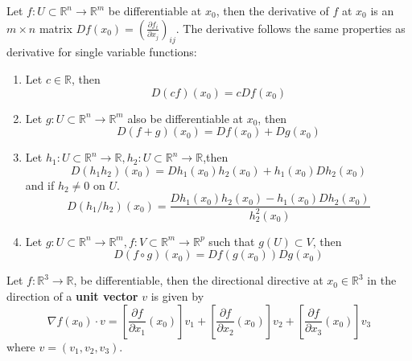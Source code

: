 \documentclass[openany]{book}
\newcommand{\R}{\mathbb{R}}
\begin{document}
\begin{prop}
    Let $f:U\subset\R^n\to\R^m$ be differentiable at $x_0$, then the derivative of $f$ at $x_0$ is an $m\times n$ matrix $Df(x_0)=\left(\frac{\partial f_i}{\partial x_j}\right)_{ij}$. The derivative follows the same properties as derivative for single variable functions:
    \begin{enumerate}
        \item Let $c\in\R$, then 
        \begin{equation*}
            D(cf)(x_0)=cDf(x_0) \tag {multiplication of a matrix by constant $c$}
        \end{equation*}
        \item Let $g: U\subset\R^n\to\R^m$ also be differentiable at $x_0$, then 
        \begin{equation*}
            D(f+g)(x_0)=Df(x_0)+Dg(x_0) \tag{sum of two matrices}
        \end{equation*}
        \item Let $h_1: U\subset\R^n\to\R, h_2: U\subset\R^n\to\R$,then 
        \begin{equation*}
            D(h_1h_2)(x_0)=Dh_1(x_0)h_2(x_0)+h_1(x_0)Dh_2(x_0) \tag{product rule}
        \end{equation*}
        and if $h_2\neq 0$ on $U$.
        \begin{equation*}
            D(h_1/h_2)(x_0)=\frac{Dh_1(x_0)h_2(x_0)-h_1(x_0)Dh_2(x_0)}{h_2^2(x_0)} \tag{quotient rule}
        \end{equation*}
        \item Let $g: U\subset\R^n\to\R^m, f:V\subset\R^m\to\R^p$ such that $g(U)\subset V$, then 
        \begin{equation*}
            D(f\circ g)(x_0)=Df(g(x_0))Dg(x_0) \tag{chain rule}
        \end{equation*}
    \end{enumerate}
\end{prop}

\begin{defn}
    Let $f:\R^3\to\R$, be differentiable, then the directional directive at $x_0\in\R^3$ in the direction of a \textbf{unit vector} $v$ is given by 
    \begin{equation*}
        \nabla f(x_0)\cdot v=\left[\frac{\partial f}{\partial x_1}(x_0)\right]v_1+\left[\frac{\partial f}{\partial x_2}(x_0)\right]v_2+\left[\frac{\partial f}{\partial x_3}(x_0)\right]v_3
    \end{equation*}
    where $v=(v_1,v_2,v_3)$.
\end{defn}
\end{document}
